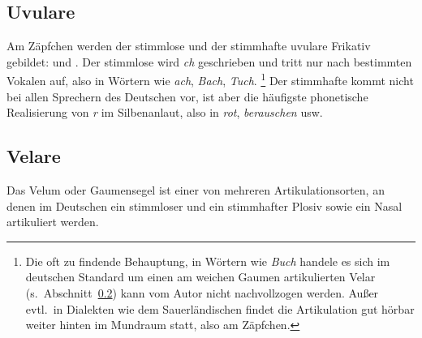 \subsection{Uvulare}


Am Zäpfchen werden der stimmlose und der stimmhafte uvulare Frikativ gebildet: \textipa{[X]} und \textipa{[K]}.
Der stimmlose wird \textit{ch} geschrieben und tritt nur nach bestimmten Vokalen auf, also in Wörtern wie \textit{ach}, \textit{Bach}, \textit{Tuch}.%
\footnote{Die oft zu findende Behauptung, in Wörtern wie \textit{Buch} handele es sich im deutschen Standard um einen am weichen Gaumen artikulierten Velar \textipa{[x]} (s.\ Abschnitt~\ref{sec:velar}) kann vom Autor nicht nachvollzogen werden.
Außer evtl.\ in Dialekten wie dem Sauerländischen findet die Artikulation gut hörbar weiter hinten im Mundraum statt, also am Zäpfchen.
}
Der stimmhafte kommt nicht bei allen Sprechern des Deutschen vor, ist aber die häufigste phonetische Realisierung von \textit{r} im Silbenanlaut, also in \textit{rot}, \textit{berauschen} usw.


\subsection{Velare}

\label{sec:velar}


Das Velum oder Gaumensegel ist einer von mehreren Artikulationsorten, an denen im Deutschen ein stimmloser und ein stimmhafter Plosiv sowie ein Nasal artikuliert werden.

